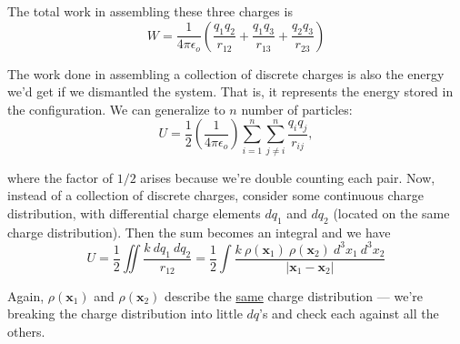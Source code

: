\documentclass{article}
\begin{document}
\begin{figure}[H]
\centering
{}
\label{fig:3:b}
\end{figure}

The total work in assembling these three charges is
\begin{equation*}
    W = \frac{1}{4\pi\epsilon_o} \left( \frac{q_1 q_2}{r_{12}} + \frac{q_1 q_3}{r_{13}} + \frac{q_2 q_3}{r_{23}} \right)
\end{equation*}

The work done in assembling a collection of discrete charges is also the energy we'd get if we dismantled the system. That is, it represents the energy stored in the configuration. We can generalize to $n$ number of particles:
\begin{equation*}
    U = \frac{1}{2} \left(\frac{1}{4\pi\epsilon_o}\right) \sum\limits_{i = 1}^{n} \sum\limits_{j \neq i}^{n} \frac{q_i q_j}{r_{ij}},
\end{equation*}

where the factor of $1/2$ arises because we're double counting each pair. Now, instead of a collection of discrete charges, consider some continuous charge distribution, with differential charge elements $dq_1$ and $dq_2$ (located on the same charge distribution). Then the sum becomes an integral and we have
\begin{equation}
    U = \frac{1}{2} \iint \frac{k\ dq_1\ dq_2}{r_{12}} = \frac{1}{2} \int \frac{k\ \rho(\bm{x}_1)\ \rho(\bm{x}_2)\ d^3x_1\ d^3x_2}{\left| \bm{x}_1 - \bm{x}_2 \right|} \tag{1} \label{eq:3:uu}
\end{equation}

Again, $\rho(\bm{x}_1)$ and $\rho(\bm{x}_2)$ describe the \underline{same} charge distribution --- we're breaking the charge distribution into little $dq$'s and check each against all the others.
\end{document}
